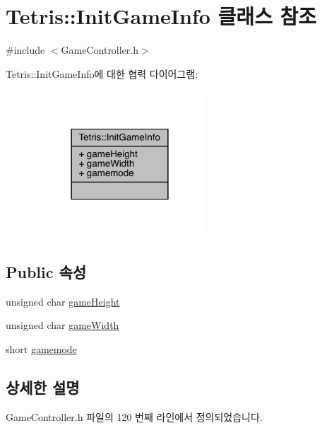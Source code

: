 \hypertarget{class_tetris_1_1_init_game_info}{}\section{Tetris\+:\+:Init\+Game\+Info 클래스 참조}
\label{class_tetris_1_1_init_game_info}


{\ttfamily \#include $<$Game\+Controller.\+h$>$}



Tetris\+:\+:Init\+Game\+Info에 대한 협력 다이어그램\+:
\nopagebreak
\begin{figure}[H]
\begin{center}
\leavevmode
\includegraphics[width=182pt]{class_tetris_1_1_init_game_info__coll__graph}
\end{center}
\end{figure}
\subsection*{Public 속성}
\begin{DoxyCompactItemize}
\item 
unsigned char \hyperlink{class_tetris_1_1_init_game_info_a4b0520a703e20bf84077c2d9706a0ef2}{game\+Height}
\item 
unsigned char \hyperlink{class_tetris_1_1_init_game_info_a035e9d0d8d8b92436b2683627ca51059}{game\+Width}
\item 
short \hyperlink{class_tetris_1_1_init_game_info_a5d4655981462fd53da508dfba0d2e99c}{gamemode}
\end{DoxyCompactItemize}


\subsection{상세한 설명}


Game\+Controller.\+h 파일의 120 번째 라인에서 정의되었습니다.



